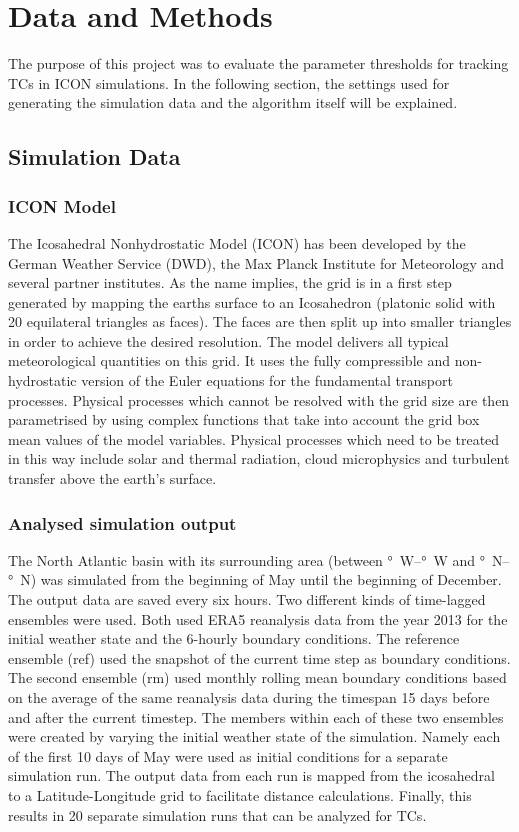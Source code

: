 \chapter{Data and Methods}
\label{sec:methods}
The purpose of this project was to evaluate the parameter thresholds for
tracking TCs in ICON simulations. In the following section, the settings
used for generating the simulation data and the algorithm itself will be
explained.
\section{Simulation Data}
\label{sec:data}
\subsection*{ICON Model}
The Icosahedral Nonhydrostatic Model (ICON) has been developed by the German Weather
Service (DWD), the Max Planck Institute for Meteorology and several partner
institutes\cite{icon-model}. As the name implies, the grid is in a first step generated by
mapping the earths surface to an Icosahedron (platonic solid with 20
equilateral triangles as faces). The faces are then split up into smaller
triangles in order to achieve the desired resolution. The model delivers
all typical meteorological quantities on this grid.
It uses the fully compressible and non-hydrostatic version of the Euler
equations for the fundamental transport processes. Physical processes which
cannot be resolved with the grid size are then parametrised by using complex
functions that take into account the grid box mean values of the model
variables. Physical processes which need to be treated in this way include
solar and thermal radiation, cloud microphysics and turbulent transfer above
the earth's surface\cite{dwd-icon}.

\subsection*{Analysed simulation output}
The North Atlantic basin with its surrounding area (between \unit[120]{\degree W}--\unit[15]{\degree W} and \unit[0]{\degree N}--\unit[70]{\degree N}) was simulated from the beginning of May until the beginning of December. The
output data are saved every six hours.
Two different kinds of time-lagged ensembles were used. Both used ERA5
reanalysis data from the year 2013 for the initial weather state and the 6-hourly boundary
conditions. The reference ensemble (ref) used the snapshot of the current time step as boundary conditions. The second ensemble (rm) used
monthly rolling mean boundary conditions based on the average of the same reanalysis data during the timespan 15 days before and after the current timestep. 
The members within each of these two ensembles were created by varying the
initial weather state of the simulation. Namely each of the first 10 days of
May were used as initial conditions for a separate simulation run.
The output data from each run is mapped from the icosahedral to a
Latitude-Longitude grid to facilitate distance calculations.
Finally, this results in 20 separate simulation runs that can be analyzed for
TCs.

